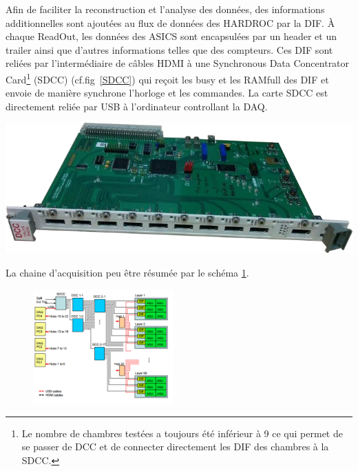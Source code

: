 Afin de faciliter la reconstruction et l'analyse des données, des informations additionnelles sont ajoutées au flux de données des HARDROC par la DIF. À chaque ReadOut, les données des ASICS sont encapsulées par un header et un trailer ainsi que d'autres informations telles que des compteurs. Ces DIF sont reliées par l'intermédiaire de câbles HDMI à une Synchronous Data Concentrator Card\footnote{Le nombre de chambres testées a toujours été inférieur à \num{9} ce qui permet de se passer de DCC et de connecter directement les DIF des chambres à la SDCC.} (SDCC) (cf.fig~\ref{SDCC}) \cite{Baulieu:2015pfa} qui reçoit les busy et les RAMfull des DIF et envoie de manière synchrone l'horloge et les commandes. La carte SDCC est directement reliée par USB à l'ordinateur controllant la DAQ.

\marginpar
{
	\centering
	\includegraphics[width=\marginparwidth]{GLA/SDCC.png}
	\label{SDCC}
}


La chaine d'acquisition peu être résumée par le schéma \ref{chaine}. 

\begin{figure}[ht!]
	\centering
	\includegraphics[width=0.48\textwidth]{GLA/chaine.png}
	\label{chaine}
\end{figure}

